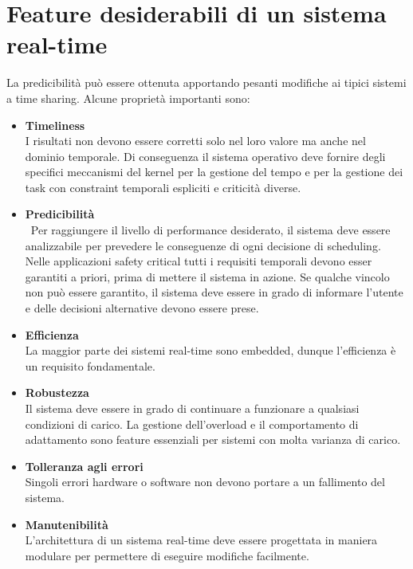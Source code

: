 \documentclass[12pt,openany,onesided]{book}
\begin{document}
\section{Feature desiderabili di un sistema real-time}
La predicibilità può essere ottenuta apportando pesanti modifiche ai tipici sistemi a time sharing.
Alcune proprietà importanti sono:
\begin{itemize}
\item \textbf{Timeliness}\\
    I risultati non devono essere corretti solo nel loro valore ma anche nel dominio temporale.
    Di conseguenza il sistema operativo deve fornire degli specifici meccanismi del kernel per la gestione del tempo e 
    per la gestione dei task con constraint temporali espliciti e criticità diverse.
\item \textbf{Predicibilità}\\\
    Per raggiungere il livello di performance desiderato, il sistema deve essere analizzabile per prevedere le conseguenze di ogni decisione di scheduling.
    Nelle applicazioni safety critical tutti i requisiti temporali devono esser garantiti a priori, prima di mettere il sistema in azione.
    Se qualche vincolo non può essere garantito, il sistema deve essere in grado di informare l'utente e delle decisioni alternative devono essere prese.
\item \textbf{Efficienza}\\
    La maggior parte dei sistemi real-time sono embedded, dunque l'efficienza è un requisito fondamentale.
\item \textbf{Robustezza}\\
    Il sistema deve essere in grado di continuare a funzionare a qualsiasi condizioni di carico. La gestione dell'overload e il comportamento di adattamento sono feature essenziali per sistemi con molta varianza di carico.
\item \textbf{Tolleranza agli errori}\\
    Singoli errori hardware o software non devono portare a un fallimento del sistema.
\item \textbf{Manutenibilità}\\
    L'architettura di un sistema real-time deve essere progettata in maniera modulare per permettere di eseguire modifiche facilmente.
\end{itemize}
\end{document}
